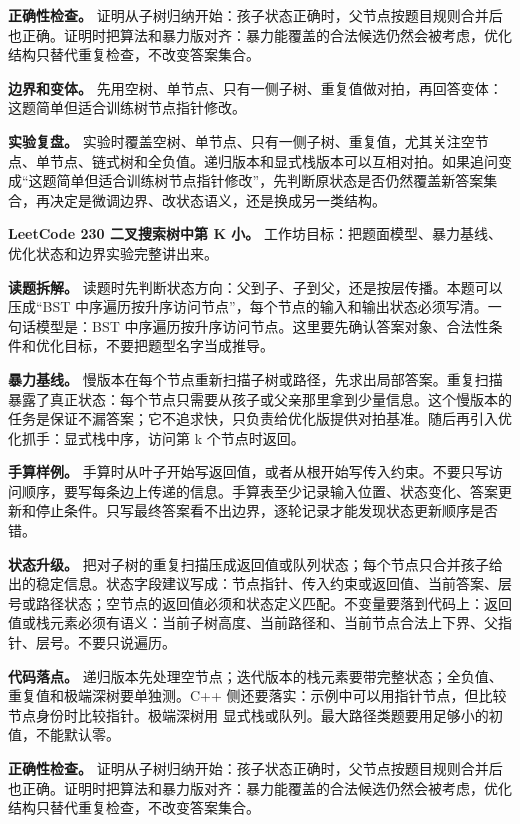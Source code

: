 \textbf{正确性检查。} 证明从子树归纳开始：孩子状态正确时，父节点按题目规则合并后也正确。证明时把算法和暴力版对齐：暴力能覆盖的合法候选仍然会被考虑，优化结构只替代重复检查，不改变答案集合。

\textbf{边界和变体。} 先用空树、单节点、只有一侧子树、重复值做对拍，再回答变体：这题简单但适合训练树节点指针修改。

\textbf{实验复盘。} 实验时覆盖空树、单节点、只有一侧子树、重复值，尤其关注空节点、单节点、链式树和全负值。递归版本和显式栈版本可以互相对拍。如果追问变成“这题简单但适合训练树节点指针修改”，先判断原状态是否仍然覆盖新答案集合，再决定是微调边界、改状态语义，还是换成另一类结构。

\noindent\textbf{LeetCode 230 二叉搜索树中第 K 小。} 工作坊目标：把题面模型、暴力基线、优化状态和边界实验完整讲出来。

\textbf{读题拆解。} 读题时先判断状态方向：父到子、子到父，还是按层传播。本题可以压成“BST 中序遍历按升序访问节点”，每个节点的输入和输出状态必须写清。一句话模型是：BST 中序遍历按升序访问节点。这里要先确认答案对象、合法性条件和优化目标，不要把题型名字当成推导。

\textbf{暴力基线。} 慢版本在每个节点重新扫描子树或路径，先求出局部答案。重复扫描暴露了真正状态：每个节点只需要从孩子或父亲那里拿到少量信息。这个慢版本的任务是保证不漏答案；它不追求快，只负责给优化版提供对拍基准。随后再引入优化抓手：显式栈中序，访问第 k 个节点时返回。

\textbf{手算样例。} 手算时从叶子开始写返回值，或者从根开始写传入约束。不要只写访问顺序，要写每条边上传递的信息。手算表至少记录输入位置、状态变化、答案更新和停止条件。只写最终答案看不出边界，逐轮记录才能发现状态更新顺序是否错。

\textbf{状态升级。} 把对子树的重复扫描压成返回值或队列状态；每个节点只合并孩子给出的稳定信息。状态字段建议写成：节点指针、传入约束或返回值、当前答案、层号或路径状态；空节点的返回值必须和状态定义匹配。不变量要落到代码上：返回值或栈元素必须有语义：当前子树高度、当前路径和、当前节点合法上下界、父指针、层号。不要只说遍历。

\textbf{代码落点。} 递归版本先处理空节点；迭代版本的栈元素要带完整状态；全负值、重复值和极端深树要单独测。C++ 侧还要落实：示例中可以用指针节点，但比较节点身份时比较指针。极端深树用  显式栈或队列。最大路径类题要用足够小的初值，不能默认零。

\textbf{正确性检查。} 证明从子树归纳开始：孩子状态正确时，父节点按题目规则合并后也正确。证明时把算法和暴力版对齐：暴力能覆盖的合法候选仍然会被考虑，优化结构只替代重复检查，不改变答案集合。

